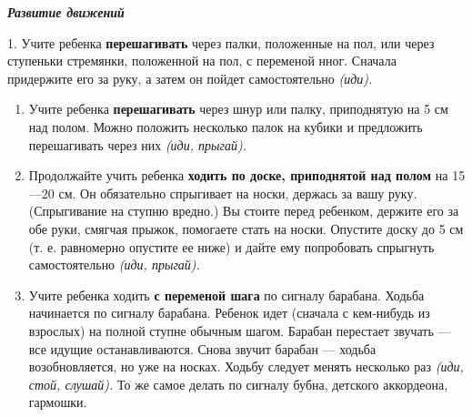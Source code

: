 \documentclass[a5paper]{book}
\renewcommand{\emph}[1]{\textit{#1}}
\begin{document}
\emph{\textbf{Развитие движений}}

1. Учите ребенка \textbf{перешагивать} через палки, положенные на пол,
или через ступеньки стремянки, положенной на пол, с переменой нног.
Сначала придержите его за руку, а затем он пойдет самостоятельно
\emph{(иди).}


\begin{enumerate}
\def\labelenumi{\arabic{enumi}.}
\setcounter{enumi}{1}
\item
  
  Учите ребенка \textbf{перешагивать} через шнур или палку, приподнятую
  на 5 см над полом. Можно положить несколько палок на кубики и
  предложить перешагивать через них \emph{(иди, прыгай).}
  
\item
  
  Продолжайте учить ребенка \textbf{ходить по доске, приподнятой над
  полом} на 15---20 см. Он обязательно спрыгивает на носки, держась за
  вашу руку. (Спрыгивание на ступню вредно.) Вы стоите перед ребенком,
  держите его за обе руки, смягчая прыжок, помогаете стать на носки.
  Опустите доску до 5 см (т. е. равномерно опустите ее ниже) и дайте ему
  попробовать спрыгнуть самостоятельно \emph{(иди, прыгай).}
  
\item
  
  Учите ребенка ходить \textbf{с переменой шага} по сигналу барабана.
  Ходьба начинается по сигналу барабана. Ребенок идет (сначала с
  кем-нибудь из взрослых) на полной ступне обычным шагом. Барабан
  перестает звучать --- все идущие останавливаются. Снова звучит барабан
  --- ходьба возобновляется, но уже на носках. Ходьбу следует менять
  несколько раз \emph{(иди, стой, слушай).} То же самое делать по
  сигналу бубна, детского аккордеона, гармошки.
  
\end{enumerate}
\end{document}
